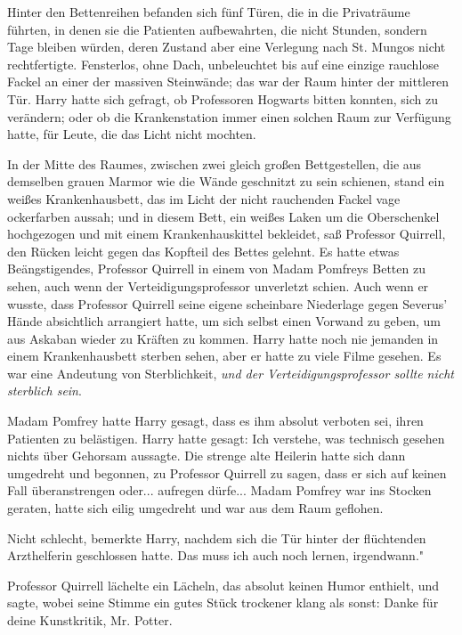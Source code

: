 Hinter den Bettenreihen befanden sich fünf Türen, die in die Privaträume
führten, in denen sie die Patienten aufbewahrten, die nicht Stunden, sondern
Tage bleiben würden, deren Zustand aber eine Verlegung nach St. Mungos nicht
rechtfertigte. Fensterlos, ohne Dach, unbeleuchtet bis auf eine einzige
rauchlose Fackel an einer der massiven Steinwände; das war der Raum hinter der
mittleren Tür. Harry hatte sich gefragt, ob Professoren Hogwarts bitten konnten,
sich zu verändern; oder ob die Krankenstation immer einen solchen Raum zur
Verfügung hatte, für Leute, die das Licht nicht mochten.

In der Mitte des Raumes, zwischen zwei gleich großen Bettgestellen, die aus
demselben grauen Marmor wie die Wände geschnitzt zu sein schienen, stand ein
weißes Krankenhausbett, das im Licht der nicht rauchenden Fackel vage
ockerfarben aussah; und in diesem Bett, ein weißes Laken um die Oberschenkel
hochgezogen und mit einem Krankenhauskittel bekleidet, saß Professor Quirrell,
den Rücken leicht gegen das Kopfteil des Bettes gelehnt. Es hatte etwas
Beängstigendes, Professor Quirrell in einem von Madam Pomfreys Betten zu sehen,
auch wenn der Verteidigungsprofessor unverletzt schien. Auch wenn er wusste,
dass Professor Quirrell seine eigene scheinbare Niederlage gegen Severus' Hände
absichtlich arrangiert hatte, um sich selbst einen Vorwand zu geben, um aus
Askaban wieder zu Kräften zu kommen. Harry hatte noch nie jemanden in einem
Krankenhausbett sterben sehen, aber er hatte zu viele Filme gesehen. Es war eine
Andeutung von Sterblichkeit, \emph{und der Verteidigungsprofessor sollte nicht
sterblich sein}.

Madam Pomfrey hatte Harry gesagt, dass es ihm absolut verboten sei, ihren
Patienten zu belästigen. Harry hatte gesagt: \glqq Ich verstehe\grqq{}, was
technisch gesehen nichts über Gehorsam aussagte. Die strenge alte Heilerin hatte
sich dann umgedreht und begonnen, zu Professor Quirrell zu sagen, dass er sich
auf keinen Fall überanstrengen oder... aufregen dürfe... Madam Pomfrey war ins
Stocken geraten, hatte sich eilig umgedreht und war aus dem Raum geflohen.

\glqq Nicht schlecht\grqq{}, bemerkte Harry, nachdem sich die Tür hinter der
flüchtenden Arzthelferin geschlossen hatte. \glqq Das muss ich auch noch lernen,
irgendwann."

Professor Quirrell lächelte ein Lächeln, das absolut keinen Humor enthielt, und
sagte, wobei seine Stimme ein gutes Stück trockener klang als sonst: \glqq Danke
für deine Kunstkritik, Mr. Potter.\grqq{}

